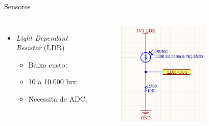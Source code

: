 \begin{frame}{Sensores}
{\begin{columns}
            \begin{itemize}
                \item \textit{Light Dependant Resistor} (LDR)
                \begin{itemize}
                    \item Baixo custo;
                    \item 10 a 10.000 lux;
                    \item Necessita de ADC;
                \end{itemize}
            \end{itemize}
            
                       
                \begin{figure}
                    \includegraphics[width=0.7\textwidth]{figuras/cap3/esquematicos/light_sensor.png}
                \end{figure}
            
            
            
            
        \end{columns}

    }

    
\end{frame}

